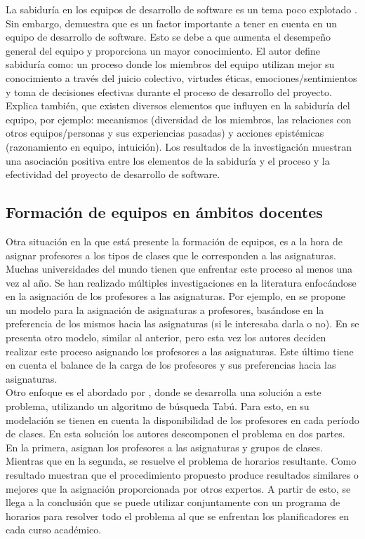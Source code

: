 La sabiduría en los equipos de desarrollo de software es un tema poco explotado \cite{Akguen2020}. Sin embargo, \cite{Akguen2020} demuestra que es un factor importante a tener en cuenta en un equipo de desarrollo de software. Esto se debe a que aumenta el desempeño general del equipo y proporciona un mayor conocimiento. El autor define sabiduría como: un proceso donde los miembros del equipo utilizan mejor su conocimiento a través del juicio colectivo, virtudes éticas, emociones/sentimientos y toma de decisiones efectivas durante el proceso de desarrollo del proyecto. Explica también, que existen diversos elementos que influyen en la sabiduría del equipo, por ejemplo: mecanismos (diversidad de los miembros, las relaciones con otros equipos/personas y sus experiencias pasadas) y acciones epistémicas (razonamiento en equipo, intuición). Los resultados de la investigación muestran una asociación positiva entre los elementos de la sabiduría y el proceso y la efectividad del proyecto de desarrollo de software.



\subsection{Formación de equipos en ámbitos docentes}

Otra situación en la que está presente la formación de equipos, es a la hora de asignar profesores a los tipos de clases que le corresponden a las asignaturas. Muchas universidades del mundo tienen que enfrentar este proceso al menos una vez al año. Se han realizado múltiples investigaciones en la literatura enfocándose en la asignación de los profesores a las asignaturas. Por ejemplo, en \cite{Bosquez2020} se propone un modelo para la asignación de asignaturas a profesores, basándose en la preferencia de los mismos hacia las asignaturas (si le interesaba darla o no). En \cite{Domenech2014} se presenta otro modelo, similar al anterior, pero esta vez los autores deciden realizar este proceso asignando los profesores a las asignaturas. Este último tiene en cuenta el balance de la carga de los profesores y sus preferencias hacia las asignaturas.\\

Otro enfoque es el abordado por \cite{AlvaresValedes2002}, donde se desarrolla una solución a este problema, utilizando un algoritmo de búsqueda Tabú. Para esto, en su modelación se tienen en cuenta la disponibilidad de los profesores en cada período de clases. En esta solución los autores descomponen el problema en dos partes. En la primera, asignan los profesores a las asignaturas y grupos de clases. Mientras que en la segunda, se resuelve el problema de horarios resultante. Como resultado muestran que el procedimiento propuesto produce resultados similares o mejores que la asignación proporcionada por otros expertos. A partir de esto, se llega a la conclusión que se puede utilizar conjuntamente con un programa de horarios para resolver todo el problema al que se enfrentan los planificadores en cada curso académico.\\

